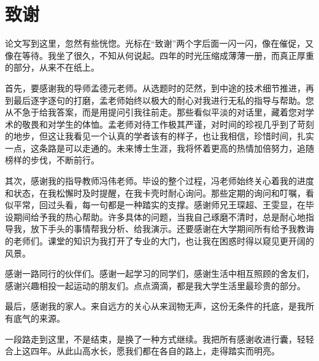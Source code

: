 \chapter*{致谢}
论文写到这里，忽然有些恍惚。光标在“致谢”两个字后面一闪一闪，像在催促，又像在等待。我坐了很久，不知从何说起。四年的时光压缩成薄薄一册，而真正厚重的部分，从来不在纸上。

首先，要感谢我的导师孟德元老师。从选题时的茫然，到中途的技术细节推进，再到最后逐字逐句的打磨，孟老师始终以极大的耐心对我进行无私的指导与帮助。您从不急于给我答案，而是用提问引我往前走。那些看似平淡的对话里，藏着您对学术的敬畏和对学生的体恤。孟老师对待工作极其严谨，对时间的珍视几乎到了苛刻的地步，但这让我看见一个认真的学者该有的样子，也让我相信，珍惜时间，扎实一点，这条路是可以走通的。未来博士生涯，我将怀着更高的热情加倍努力，追随榜样的步伐，不断前行。

其次，感谢我的指导教师冯伟老师。毕设的整个过程，冯老师始终关心着我的进度和状态，在我松懈时及时提醒，在我卡壳时耐心询问。那些定期的询问和叮嘱，看似平常，回过头看，每一句都是一种踏实的支撑。感谢师兄王琛超、王雯显，在毕设期间给予我的热心帮助。许多具体的问题，当我自己琢磨不清时，总是耐心地指导我，放下手头的事情帮我分析、给我演示。还要感谢在大学期间所有给予我教诲的老师们。课堂的知识为我打开了专业的大门，也让我在困惑时得以窥见更开阔的风景。

感谢一路同行的伙伴们。感谢一起学习的同学们，感谢生活中相互照顾的舍友们，感谢兴趣相投一起运动的朋友们。点点滴滴，都是我大学生活里最珍贵的部分。

最后，感谢我的家人。来自远方的关心从来润物无声，这份无条件的托底，是我所有底气的来源。

一段路走到这里，不是结束，是换了一种方式继续。我把所有感谢收进行囊，轻轻合上这四年。从此山高水长，愿我们都在各自的路上，走得踏实而明亮。
\cleardoublepage
